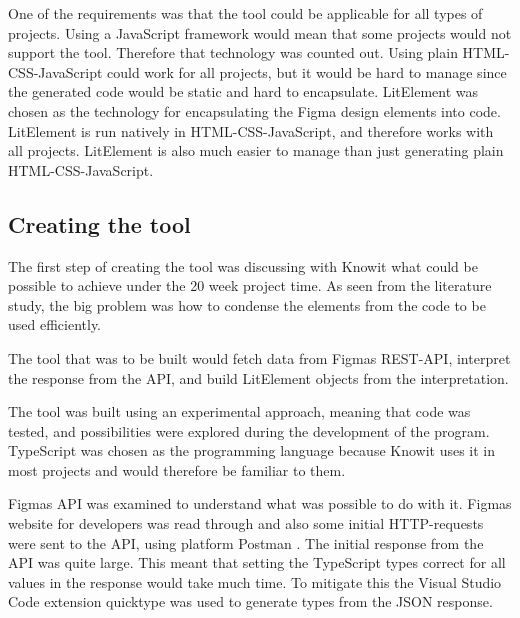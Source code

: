 One of the requirements was that the tool could be applicable for all types of projects. Using a JavaScript framework would mean that some projects would not support the tool. Therefore that technology was counted out. Using plain HTML-CSS-JavaScript could work for all projects, but it would be hard to manage since the generated code would be static and hard to encapsulate. LitElement was chosen as the technology for encapsulating the Figma design elements into code. LitElement is run natively in HTML-CSS-JavaScript, and therefore works with all projects. LitElement is also much easier to manage than just generating plain HTML-CSS-JavaScript.





\subsection{Creating the tool}%
\label{sub:}

The first step of creating the tool was discussing with Knowit what could be possible to achieve under the 20 week project time. As seen from the literature study, the big problem was how to condense the elements from the code to be used efficiently. 

The tool that was to be built would fetch data from Figmas REST-API, interpret the response from the API, and build LitElement objects from the interpretation.

The tool was built using an experimental approach, meaning that code was tested, and possibilities were explored during the development of the program. TypeScript was chosen as the programming language because Knowit uses it in most projects and would therefore be familiar to them.

Figmas API was examined to understand what was possible to do with it. Figmas website for developers\cite{figmaFigma} was read through and also some initial HTTP-requests were sent to the API, using platform Postman \cite{PostmanCollaborationPlatform}. The initial response from the API was quite large. This meant that setting the TypeScript types correct for all values in the response would take much time. To mitigate this the Visual Studio Code \cite{VisualStudioCode} extension quicktype\cite{ConvertJSONSwift} was used to generate types from the JSON response. 

